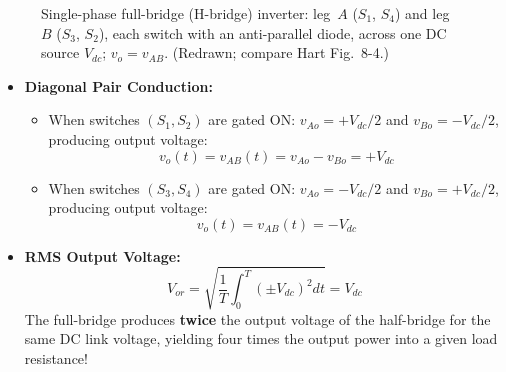 \documentclass[11pt,a4paper]{article}
\newcommand{\swleg}[4]{%
  \draw[thick] (#1,#2+0.75)--(#1,#2+0.35) (#1,#2-0.35)--(#1,#2-0.75);
  \draw[thick,fill=white] (#1-0.3,#2-0.35) rectangle (#1+0.3,#2+0.35);
  \node[font=\footnotesize] at (#1,#2) {#3};
  \draw[thick] (#1,#2+0.55)--(#1+0.75,#2+0.55)--(#1+0.75,#2+0.2) (#1+0.75,#2-0.2)--(#1+0.75,#2-0.55)--(#1,#2-0.55);
  \draw[thick,fill=black] (#1+0.63,#2-0.2)--(#1+0.87,#2-0.2)--(#1+0.75,#2+0.2)--cycle;
  \draw[thick] (#1+0.63,#2+0.2)--(#1+0.87,#2+0.2);
  \node[font=\scriptsize,right] at (#1+0.88,#2) {#4};
}
\newcommand{\cellplate}[2]{\fill[white] (#1-0.3,#2-0.2) rectangle (#1+0.3,#2+0.2);\draw[thick] (#1-0.3,#2+0.1)--(#1+0.3,#2+0.1) (#1-0.16,#2-0.1)--(#1+0.16,#2-0.1);}
\newcommand{\zbox}[4]{\draw[thick,fill=white] (#1-#3/2,#2-0.2) rectangle (#1+#3/2,#2+0.2); \node[font=\scriptsize] at (#1,#2) {#4};}
\begin{document}
\begin{figure}[htbp]
\centering
{}
\caption{Single-phase full-bridge (H-bridge) inverter: leg~$A$ ($S_1$, $S_4$) and leg~$B$ ($S_3$, $S_2$), each switch with an anti-parallel diode, across one DC source $V_{dc}$; $v_o=v_{AB}$. (Redrawn; compare Hart Fig.~8-4.)}
\label{fig:full_bridge}
\end{figure}

\begin{itemize}[leftmargin=*]
  \item \textbf{Diagonal Pair Conduction:}
  \begin{itemize}
    \item When switches $(S_1, S_2)$ are gated ON: $v_{Ao} = +V_{dc}/2$ and $v_{Bo} = -V_{dc}/2$, producing output voltage:
    \begin{equation}
    v_o(t) = v_{AB}(t) = v_{Ao} - v_{Bo} = +V_{dc}
    \end{equation}
    \item When switches $(S_3, S_4)$ are gated ON: $v_{Ao} = -V_{dc}/2$ and $v_{Bo} = +V_{dc}/2$, producing output voltage:
    \begin{equation}
    v_o(t) = v_{AB}(t) = -V_{dc}
    \end{equation}
  \end{itemize}
  \item \textbf{RMS Output Voltage:}
  \begin{equation}
  V_{or} = \sqrt{\frac{1}{T}\int_0^T (\pm V_{dc})^2 dt} = V_{dc}
  \end{equation}
  The full-bridge produces \textbf{twice} the output voltage of the half-bridge for the same DC link voltage, yielding four times the output power into a given load resistance!
\end{itemize}
\end{document}
